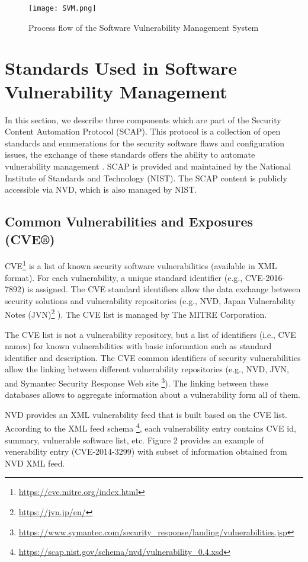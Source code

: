 \documentclass{llncs}
\begin{document}
\begin{figure}
 
  \centering
    \texttt{[image: SVM.png]}
     \caption{Process flow of the Software Vulnerability Management System}
\end{figure}

\section{Standards	Used	in	Software	Vulnerability	Management}
 
 In	this section, we describe three	components which are part of the Security	 Content	Automation	Protocol (SCAP). This protocol is a collection of open standards and enumerations for the	security  software flaws	 and configuration issues, the exchange of these	standards	offers	the	ability	to	automate	vulnerability	management \cite{scap_doc}.		
 SCAP is provided	and	maintained	by	the	National	Institute	of	Standards	and	Technology (NIST). The SCAP	content	is	publicly accessible via  NVD, which is also managed	by NIST.
 
 
 \subsection{Common Vulnerabilities and Exposures (CVE®)} 
 CVE\footnote{\url{https://cve.mitre.org/index.html}} is a list of known security software vulnerabilities (available in XML format). For each vulnerability, a unique standard identifier (e.g., CVE-2016-7892) is assigned. The CVE standard identifiers allow the data exchange between security solutions and vulnerability repositories (e.g., NVD, Japan Vulnerability Notes (JVN)\footnote{\url{https://jvn.jp/en/}} ). The CVE list is managed by The MITRE Corporation.

 The CVE list is not a vulnerability repository, but a list of identifiers (i.e., CVE names) for  known vulnerabilities with basic information such as standard identifier and description. The CVE common identifiers of security vulnerabilities allow the linking between different vulnerability repositories (e.g., NVD, JVN, and Symantec Security Response Web site \footnote{\url{https://www.symantec.com/security_response/landing/vulnerabilities.jsp}}). The linking between these databases allows to aggregate information about a vulnerability form all of them. 
 
 NVD provides an XML vulnerability feed that is built based on the CVE list. According to the XML feed schema \footnote{\url{https://scap.nist.gov/schema/nvd/vulnerability_0.4.xsd}}, each vulnerability entry contains CVE id, summary, vulnerable software list, etc. Figure 2 provides an example of venerability entry (CVE-2014-3299) with subset of information obtained from NVD XML feed.
\end{document}
